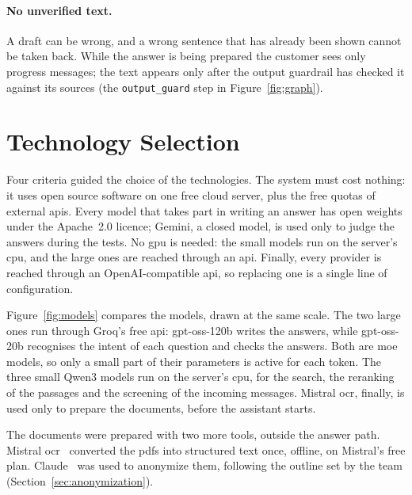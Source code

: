 \paragraph{No unverified text.} A draft can be wrong, and a wrong sentence that has already been
shown cannot be taken back. While the answer is being prepared the customer sees only progress
messages; the text appears only after the output guardrail has checked it against its sources
(the \texttt{output\_guard} step in Figure~\ref{fig:graph}).

\section{Technology Selection}
\label{sec:technology-selection}

Four criteria guided the choice of the technologies. The system must cost nothing: it uses open
source software on one free cloud server, plus the free quotas of external \acsp{api}. Every model
that takes part in writing an answer has open weights under the Apache~2.0 licence; Gemini, a
closed model, is used only to judge the answers during the tests. No \ac{gpu} is needed: the small
models run on the server's \ac{cpu}, and the large ones are reached through an \ac{api}. Finally,
every provider is reached through an OpenAI-compatible \ac{api}, so replacing one is a single line
of configuration.

Figure~\ref{fig:models} compares the models, drawn at the same scale. The two large ones run
through Groq's free \ac{api}: gpt-oss-120b writes the answers, while gpt-oss-20b recognises the
intent of each question and checks the answers. Both are \ac{moe} models, so only a small part of
their parameters is active for each token. The three small Qwen3 models run on the server's
\ac{cpu}, for the search, the reranking of the passages and the screening of the incoming messages.
Mistral \ac{ocr}, finally, is used only to prepare the documents, before the assistant starts.



The documents were prepared with two more tools, outside the answer path. Mistral
\ac{ocr}~\cite{mistral2026ocr} converted the \acsp{pdf} into structured text once, offline, on
Mistral's free plan. Claude~\cite{anthropic2026claude} was used to anonymize
them, following the outline set by the team (Section~\ref{sec:anonymization}).

